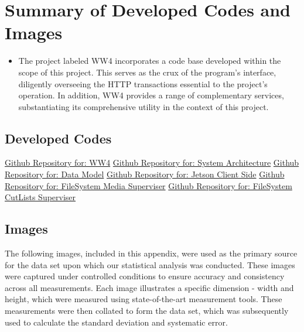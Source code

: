 \chapter{Summary of  Developed Codes and Images}
\label{apendice2}


\begin{itemize}
    \item The project labeled WW4 incorporates a code base developed within the scope of this project. This serves as the crux of the program's interface, diligently overseeing the HTTP transactions essential to the project's operation. In addition, WW4 provides a range of complementary services, substantiating its comprehensive utility in the context of this project.
\end{itemize}

\clearpage
\section{Developed Codes }\label{appendice:code}

\begin{center}
    \href{https://github.com/iaggocapitanio1/woodWork4.0_API}{Github Repository for: WW4}
    \href{https://github.com/iaggocapitanio1/WoodWork40}{Github Repository for: System Architecture}
    \href{https://github.com/More-Collaborative-Laboratory/ww4zero}{Github Repository for: Data Model}
    \href{https://github.com/iaggocapitanio1/leftover-clientside}{Github Repository for: Jetson Client Side}
    \href{https://github.com/iaggocapitanio1/WW4FileFinder}{Github Repository for: FileSystem Media Superviser}
    \href{https://github.com/iaggocapitanio1/WWWatcher}{Github Repository for: FileSystem CutLists Superviser}
\end{center}


\section{Images}
The following images, included in this appendix, were used as the primary source for the data set upon which our statistical analysis was conducted. These images were captured under controlled conditions to ensure accuracy and consistency across all measurements. Each image illustrates a specific dimension - width and height, which were measured using state-of-the-art measurement tools. These measurements were then collated to form the data set, which was subsequently used to calculate the standard deviation and systematic error. 


